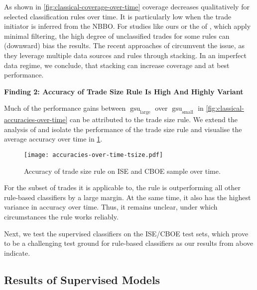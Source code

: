 As shown in \cref{fig:classical-coverage-over-time} coverage decreases qualitatively for selected classification rules over time. It is particularly low when the trade initiator is inferred from the \gls{NBBO}. For studies like ours or the of \textcites{grauerOptionTradeClassification2022}[][887]{savickasInferringDirectionOption2003}, which apply minimal filtering, the high degree of unclassified trades for some rules can (downward) bias the results. The recent approaches of \textcite[][18--19]{grauerOptionTradeClassification2022} circumvent the issue, as they leverage multiple data sources and rules through stacking. In an imperfect data regime, we conclude, that stacking can increase coverage and at best performance.

\textbf{Finding 2: Accuracy of Trade Size Rule Is High And Highly Variant}

Much of the performance gains between $\operatorname{gsu}_{\mathrm{large}}$ over $\operatorname{gsu}_{\mathrm{small}}$ in \cref{fig:classical-accuracies-over-time} can be attributed to the trade size rule. We extend the analysis of \textcite[][19]{grauerOptionTradeClassification2022} and isolate the performance of the trade size rule and visualise the average accuracy over time in \cref{fig:accuracies-over-time-tsize}.

\begin{figure}[!h]
    \centering
    \texttt{[image: accuracies-over-time-tsize.pdf]}
    \caption[Accuracy Over Trade Size Rule On  and  Over Time]{Accuracy of trade size rule on \gls{ISE} and \gls{CBOE} sample over time.}
    \label{fig:accuracies-over-time-tsize}
\end{figure}

For the subset of trades it is applicable to, the rule is outperforming all other rule-based classifiers by a large margin. At the same time, it also has the highest variance in accuracy over time. Thus, it remains unclear, under which circumstances the rule works reliably.

Next, we test the supervised classifiers on the \gls{ISE}/\gls{CBOE} test sets, which prove to be a challenging test ground for rule-based classifiers as our results from above indicate.

\subsection{Results of Supervised
    Models}\label{sec:results-of-supervised-models}

